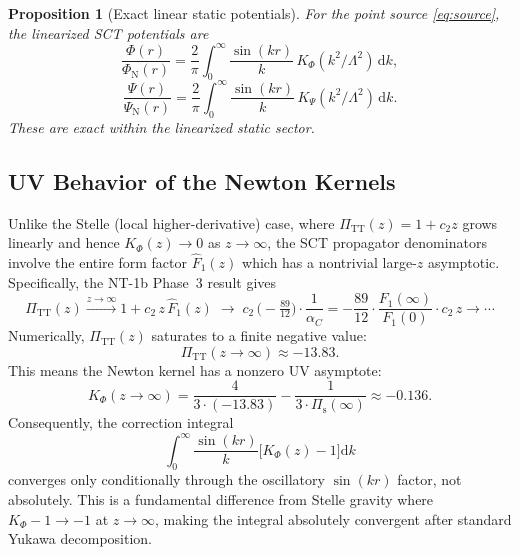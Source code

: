 \documentclass[11pt,a4paper]{article}
\newcommand{\dd}{\mathrm{d}}
\newcommand{\PiTT}{\Pi_{\mathrm{TT}}}
\newcommand{\Pis}{\Pi_{\mathrm{s}}}
\newcommand{\KPhi}{K_\Phi}
\newcommand{\KPsi}{K_\Psi}
\newcommand{\Fhat}{\hat{F}}
\newtheorem{proposition}[theorem]{Proposition}
\begin{document}
\begin{proposition}[Exact linear static potentials]
\label{prop:exact-potentials}
For the point source \eqref{eq:source}, the linearized SCT potentials are
\begin{equation}\label{eq:Phi-exact}
  \frac{\Phi(r)}{\Phi_{\mathrm{N}}(r)}
  = \frac{2}{\pi}\int_0^\infty \frac{\sin(kr)}{k}\,
  \KPhi(k^2/\Lambda^2)\,\dd k,
\end{equation}
\begin{equation}\label{eq:Psi-exact}
  \frac{\Psi(r)}{\Psi_{\mathrm{N}}(r)}
  = \frac{2}{\pi}\int_0^\infty \frac{\sin(kr)}{k}\,
  \KPsi(k^2/\Lambda^2)\,\dd k.
\end{equation}
These are exact within the linearized static sector.
\end{proposition}

\subsection{UV Behavior of the Newton Kernels}
\label{sec:uv-kernels}

Unlike the Stelle (local higher-derivative) case, where $\PiTT(z) = 1 + c_2 z$
grows linearly and hence $\KPhi(z) \to 0$ as $z \to \infty$, the SCT
propagator denominators involve the entire form factor $\Fhat_1(z)$ which
has a nontrivial large-$z$ asymptotic.  Specifically, the NT-1b Phase~3
result gives
\begin{equation}\label{eq:uv-PiTT}
  \PiTT(z) \xrightarrow{z\to\infty}
  1 + c_2\,z\,\Fhat_1(z)
  \;\to\;
  c_2\,\bigl(-\tfrac{89}{12}\bigr)\cdot\frac{1}{\alpha_C}
  = -\frac{89}{12}\cdot\frac{F_1(\infty)}{F_1(0)}\cdot c_2\,z\to\cdots
\end{equation}
Numerically, $\PiTT(z)$ saturates to a finite negative value:
\begin{equation}\label{eq:PiTT-inf}
  \PiTT(z \to \infty) \approx -13.83.
\end{equation}
This means the Newton kernel has a nonzero UV asymptote:
\begin{equation}\label{eq:KPhi-inf}
  \KPhi(z \to \infty)
  = \frac{4}{3 \cdot (-13.83)} - \frac{1}{3 \cdot \Pis(\infty)}
  \approx -0.136.
\end{equation}
Consequently, the correction integral
\[
  \int_0^\infty \frac{\sin(kr)}{k}\bigl[\KPhi(z) - 1\bigr]\dd k
\]
converges only conditionally through the oscillatory $\sin(kr)$ factor,
not absolutely.  This is a fundamental difference from Stelle gravity
where $\KPhi - 1 \to -1$ at $z \to \infty$, making the integral
absolutely convergent after standard Yukawa decomposition.
\end{document}
